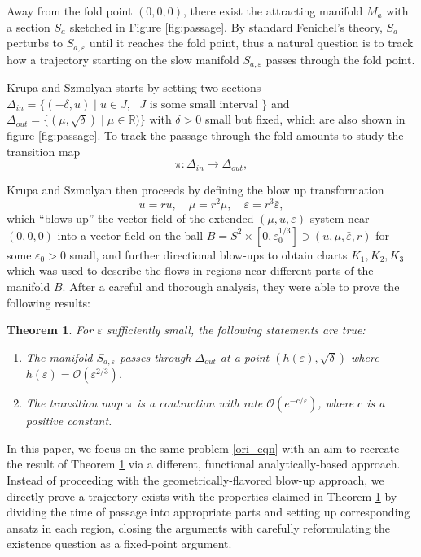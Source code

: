 \documentclass[letterpaper,11pt]{article}
\newcommand{\rmO}{\mathcal{O}}
\newcommand{\eps}{\varepsilon}
\numberwithin{equation}{section}
\theoremstyle{plain}
\newtheorem{theorem}{Theorem}[section]
\begin{document}
 Away from the fold point $(0,0,0)$, there exist the attracting manifold $M_a$ with a section $S_a$ sketched in Figure \ref{fig:passage}. By standard Fenichel's theory, $S_a$ perturbs to $S_{a,\eps}$ until it reaches the fold point, thus a natural question is to track how a trajectory starting on the slow manifold $S_{a,\eps}$ passes through the fold point.

Krupa and Szmolyan starts by setting two sections $\Delta_{in} = \{(-\delta, u) \mid u\in J,\text{ $J$ is some small interval }\}$ and $\Delta_{out} = \{( \mu ,\sqrt{\delta})\mid \mu \in \mathbb{R})\}$ with $\delta>0$ small but fixed, which are also shown in figure \ref{fig:passage}. To track the passage through the fold amounts to study the transition map 
\[
\pi: \Delta_{in} \to \Delta_{out},
\]

Krupa and Szmolyan then proceeds by defining the blow up transformation
\[
u =\bar{r} \bar{u},  \quad \mu = \bar{r}^2 \bar{\mu}, \quad  \eps = \bar{r}^3 \bar{\eps},
\]
which ``blows up'' the vector field of the extended $(\mu, u, \eps)$ system near $(0,0,0)$ into a vector field on the ball $B = S^2 \times [0,\eps_0^{1/3}] \ni (\bar{u}, \bar{\mu}, \bar{\eps}, \bar{r})$ for some $\eps_0>0$ small, and further directional blow-ups to obtain charts $K_1,K_2,K_3$ which was used to describe the flows in regions near different parts of the manifold $B$. After a careful and thorough analysis, they were able to prove the following results:
\begin{theorem}\label{ks_main}
For $\eps$ sufficiently small, the following statements are true:
\begin{enumerate}
\item The manifold $S_{a,\eps} $ passes through  $\Delta_{out}$ at a point $(h(\eps), \sqrt{\delta})$ where $h(\eps) = \rmO(\eps^{2/3})$.
\item The transition map $\pi$ is a contraction with rate $\rmO(e^{-c/\eps} )$, where $c$ is a positive constant.
\end{enumerate}
\end{theorem}


In this paper, we focus on the same problem \eqref{ori_eqn} with an aim to recreate the result of Theorem \ref{ks_main} via a different, functional analytically-based approach. Instead of proceeding with the geometrically-flavored blow-up approach, we directly prove a trajectory exists with the properties claimed in Theorem \ref{ks_main} by dividing the time of passage into appropriate parts and setting up corresponding ansatz in each region, closing the arguments with carefully reformulating the existence question as a fixed-point argument.
\end{document}
